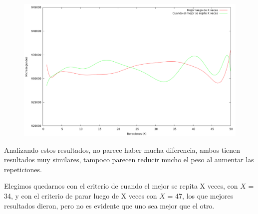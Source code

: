 \begin{figure}[H]
  \begin{center}
    \includegraphics[scale=0.35]{imagenes/grasp-criterio-peso.png}
  \end{center}
\end{figure}

\vspace*{0.5cm}

Analizando estos resultados, no parece haber mucha diferencia, ambos tienen
resultados muy similares, tampoco parecen reducir mucho el peso al
aumentar las repeticiones.

Elegimos quedarnos con el criterio de cuando el mejor se repita X veces, con
$X$ = 34, y con el criterio de parar luego de X veces con $X$ = 47, los que
mejores resultados dieron, pero no es evidente que uno sea mejor que el otro.
